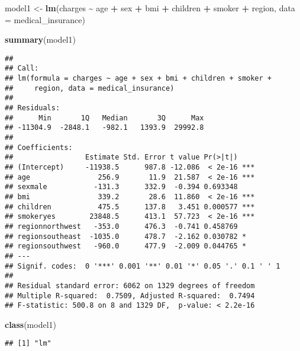 \documentclass[
]{article}
\newenvironment{Shaded}{\begin{snugshade}}{\end{snugshade}}
\newcommand{\AttributeTok}[1]{\textcolor[rgb]{0.13,0.29,0.53}{#1}}
\newcommand{\FunctionTok}[1]{\textcolor[rgb]{0.13,0.29,0.53}{\textbf{#1}}}
\newcommand{\NormalTok}[1]{#1}
\newcommand{\OtherTok}[1]{\textcolor[rgb]{0.56,0.35,0.01}{#1}}
\newcommand{\SpecialCharTok}[1]{\textcolor[rgb]{0.81,0.36,0.00}{\textbf{#1}}}
\begin{document}
\begin{Shaded}
\begin{Highlighting}[]
\NormalTok{model1 }\OtherTok{\textless{}{-}} \FunctionTok{lm}\NormalTok{(charges }\SpecialCharTok{\textasciitilde{}}\NormalTok{ age }\SpecialCharTok{+}\NormalTok{ sex }\SpecialCharTok{+}\NormalTok{ bmi }\SpecialCharTok{+}\NormalTok{ children }\SpecialCharTok{+}\NormalTok{ smoker }\SpecialCharTok{+}\NormalTok{ region,}
             \AttributeTok{data =}\NormalTok{ medical\_insurance)}

\FunctionTok{summary}\NormalTok{(model1)}
\end{Highlighting}
\end{Shaded}

\begin{verbatim}
## 
## Call:
## lm(formula = charges ~ age + sex + bmi + children + smoker + 
##     region, data = medical_insurance)
## 
## Residuals:
##      Min       1Q   Median       3Q      Max 
## -11304.9  -2848.1   -982.1   1393.9  29992.8 
## 
## Coefficients:
##                 Estimate Std. Error t value Pr(>|t|)    
## (Intercept)     -11938.5      987.8 -12.086  < 2e-16 ***
## age                256.9       11.9  21.587  < 2e-16 ***
## sexmale           -131.3      332.9  -0.394 0.693348    
## bmi                339.2       28.6  11.860  < 2e-16 ***
## children           475.5      137.8   3.451 0.000577 ***
## smokeryes        23848.5      413.1  57.723  < 2e-16 ***
## regionnorthwest   -353.0      476.3  -0.741 0.458769    
## regionsoutheast  -1035.0      478.7  -2.162 0.030782 *  
## regionsouthwest   -960.0      477.9  -2.009 0.044765 *  
## ---
## Signif. codes:  0 '***' 0.001 '**' 0.01 '*' 0.05 '.' 0.1 ' ' 1
## 
## Residual standard error: 6062 on 1329 degrees of freedom
## Multiple R-squared:  0.7509, Adjusted R-squared:  0.7494 
## F-statistic: 500.8 on 8 and 1329 DF,  p-value: < 2.2e-16
\end{verbatim}

\begin{Shaded}
\begin{Highlighting}[]
\FunctionTok{class}\NormalTok{(model1)}
\end{Highlighting}
\end{Shaded}

\begin{verbatim}
## [1] "lm"
\end{verbatim}
\end{document}
